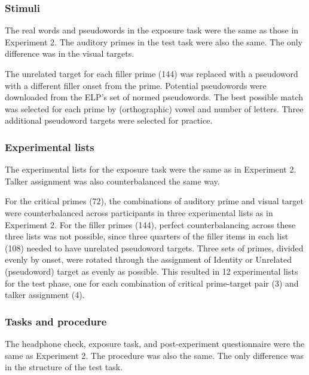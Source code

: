 \documentclass[preprint, 3p, authoryear]{elsarticle} %
\begin{document}
\hypertarget{stimuli}{%
\subsubsection{Stimuli}\label{stimuli}}

The real words and pseudowords in the exposure task were the same as those in Experiment 2.
The auditory primes in the test task were also the same.
The only difference was in the visual targets.

The unrelated target for each filler prime (144) was replaced with a pseudoword with a different filler onset from the prime.
Potential pseudowords were downloaded from the ELP's set of normed pseudowords.
The best possible match was selected for each prime by (orthographic) vowel and number of letters.
Three additional pseudoword targets were selected for practice.

\hypertarget{experimental-lists}{%
\subsubsection{Experimental lists}\label{experimental-lists}}

The experimental lists for the exposure task were the same as in Experiment 2.
Talker assignment was also counterbalanced the same way.

For the critical primes (72), the combinations of auditory prime and visual target were counterbalanced across participants in three experimental lists as in Experiment 2.
For the filler primes (144), perfect counterbalancing across these three lists was not possible, since three quarters of the filler items in each list (108) needed to have unrelated pseudoword targets.
Three sets of primes, divided evenly by onset, were rotated through the assignment of Identity or Unrelated (pseudoword) target as evenly as possible.
This resulted in 12 experimental lists for the test phase, one for each combination of critical prime-target pair (3) and talker assignment (4).

\hypertarget{tasks-and-procedure}{%
\subsubsection{Tasks and procedure}\label{tasks-and-procedure}}

The headphone check, exposure task, and post-experiment questionnaire were the same as Experiment 2.
The procedure was also the same.
The only difference was in the structure of the test task.
\end{document}
